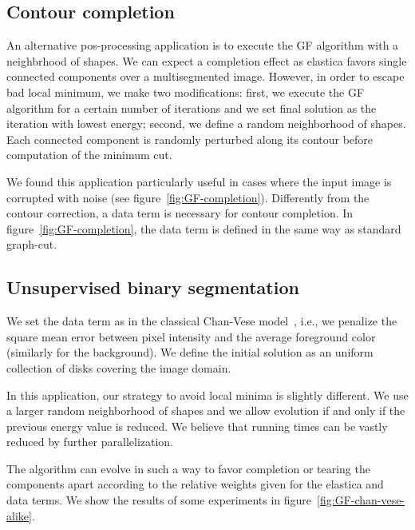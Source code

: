 \documentclass[smallextended]{svjour3}
\begin{document}
\subsection{Contour completion}

An alternative pos-processing application is to execute the GF algorithm with a neighbrhood of shapes. We can expect a completion effect as elastica favors single connected components over a multisegmented image. However, in order to escape bad local minimum, we make two modifications: first,  we execute the GF algorithm for a certain number of iterations and we set final solution as the iteration with lowest energy; second, we define a random neighborhood of shapes. Each connected component is randomly perturbed along its contour before computation of the minimum cut.

We found this application particularly useful in cases where the input image is corrupted with noise (see figure~\ref{fig:GF-completion}). Differently from the contour correction, a data term is necessary for contour completion. In figure~\ref{fig:GF-completion}, the data term is defined in the same way as standard graph-cut. 


\subsection{Unsupervised binary segmentation}
We set the data term as in the classical Chan-Vese model~\cite{chan01}, i.e., we penalize the square mean error between pixel intensity and the average foreground color (similarly for the background). We define the initial solution as an uniform collection of disks covering the image domain.

In this application, our strategy to avoid local minima is slightly different. We use a larger random neighborhood of shapes and we allow evolution if and only if the previous energy value is reduced. We believe that running times can be vastly reduced by further parallelization. 

The algorithm can evolve in such a way to favor completion or tearing the components apart according to the relative weights given for the elastica and data terms. We show the results of some experiments in figure~\ref{fig:GF-chan-vese-alike}.
\end{document}
